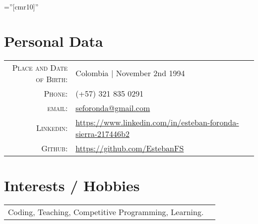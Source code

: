 \documentclass[a4paper,11pt]{article} %
\begin{document}
\pagestyle{empty} %

\font\fb=''[cmr10]'' %


\par{\bigskip\par} %

\section{Personal Data}

\begin{tabular}{rl}
\textsc{Place and Date of Birth:} & Colombia | November 2nd 1994\\
\textsc{Phone:} & (+57) 321 835 0291\\
\textsc{email:} & \href{mailto:seforonda@gmail.com}{seforonda@gmail.com}\\
\textsc{Linkedin:} & \href{https://www.linkedin.com/in/esteban-foronda-sierra-217446b2}{https://www.linkedin.com/in/esteban-foronda-sierra-217446b2}\\
\textsc{Github:} & \href{https://github.com/EstebanFS}{https://github.com/EstebanFS}\\
\end{tabular}



\section{Interests / Hobbies}
\begin{tabular}{r|p{11cm}}
Coding, Teaching, Competitive Programming, Learning.\\
\end{tabular}

\iffalse
\end{document}
